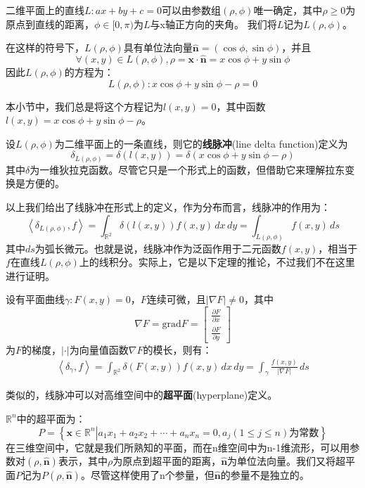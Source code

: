 \begin{definition}[二位平面上的直线系]
    二维平面上的直线$L:ax+by+c=0$可以由参数组$(\rho,\phi)$唯一确定，其中$\rho\geq 0$为原点到直线的距离，$\phi\in[0,\pi)$为$L$与x轴正方向的夹角。
    我们将$L$记为$L(\rho,\phi)$。
\end{definition}

在这样的符号下，$L(\rho,\phi)$具有单位法向量$\hat{\mathbf{n}}=(\cos\phi,\sin\phi)$，并且$$\forall (x,y)\in L(\rho,\phi),\rho=\mathbf{x}\cdot\hat{\mathbf{n}}=x\cos\phi+y\sin\phi$$
因此$L(\rho,\phi)$的方程为：
\[L(\rho,\phi): x\cos\phi+y\sin\phi-\rho=0\]

本小节中，我们总是将这个方程记为$l(x,y)=0$，其中函数$l(x,y)=x\cos\phi+y\sin\phi-\rho$。

\begin{definition}[线脉冲]
    设$L(\rho,\phi)$为二维平面上的一条直线，则它的\textbf{线脉冲}(line delta function)定义为
    \[\delta_{L(\rho,\phi)}=\delta(l(x,y))=\delta(x\cos\phi+y\sin\phi-\rho)\]
    其中$\delta$为一维狄拉克函数。尽管它只是一个形式上的函数，但借助它来理解拉东变换是方便的。
\end{definition}

以上我们给出了线脉冲在形式上的定义，作为分布而言，线脉冲的作用为：
\[\left\langle \delta_{L(\rho,\phi)},f\right\rangle=\int_{\mathbb{R}^2}\delta(l(x,y))f(x,y)\,dx\,dy=\int_{L(\rho,\phi)}f(x,y)\,ds\]
其中$ds$为弧长微元。也就是说，线脉冲作为泛函作用于二元函数$f(x,y)$，相当于$f$在直线$L(\rho,\phi)$上的线积分。实际上，它是以下定理的推论，不过我们不在这里进行证明。
\begin{claim}
    设有平面曲线$\gamma:F(x,y)=0$，$F$连续可微，且$|\nabla F|\neq 0$，其中
    \[\nabla F=\mathrm{grad}F=\begin{bmatrix}
        \frac{\partial F}{\partial x}\\
        \frac{\partial F}{\partial y}        
    \end{bmatrix}\]
    为$F$的梯度，$|\cdot|$为向量值函数$\nabla F$的模长，则有：
    \begin{align*}
        \left\langle \delta_{\gamma},f\right\rangle=\int_{\mathbb{R}^2}\delta(F(x,y))f(x,y)\,dx\,dy=\int_{\gamma}\frac{f(x,y)}{|\nabla F|}\,ds
    \end{align*}
\end{claim}

类似的，线脉冲可以对高维空间中的\textbf{超平面}(hyperplane)定义。
\begin{definition}
$\mathbb{R}^n$中的超平面为：
\[P=\left\{\mathbf{x}\in\mathbb{R}^n\left|a_1 x_1+a_2 x_2+\cdots+a_n x_n=0,a_j(1\leq j\leq n)\text{为常数}\right.\right\}\]
在三维空间中，它就是我们所熟知的平面，而在n维空间中为n-1维流形，可以用参数对$(\rho,\hat{\mathbf{n}})$表示，其中$\rho$为原点到超平面的距离，$\hat{\mathbf{n}}$为单位法向量。我们又将超平面$P$记为$P(\rho,\hat{\mathbf{n}})$。尽管这样使用了n个参量，但$\hat{\mathbf{n}}$的参量不是独立的。
\end{definition}

